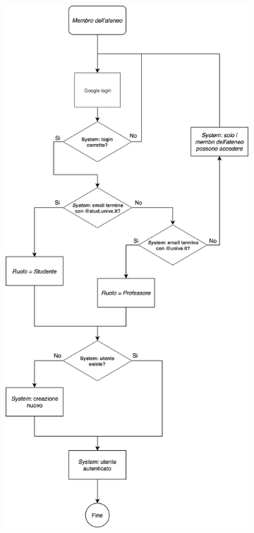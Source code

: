 \begin{figure}[H]
	\centering
	\begin{subfigure}[b]{0.5\textwidth}
		\includegraphics[width=\textwidth]{Chapter3/Figs/univelogin}

\end{subfigure}
\end{figure}
